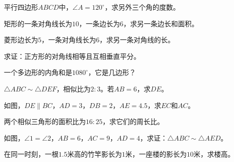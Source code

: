 \documentclass[a4paper,12pt]{ctexart}
\begin{document}



\begin{exercise}
\item 平行四边形$ABCD$中，$\angle A=120^\circ$，求另外三个角的度数。
\item 矩形的一条对角线长为$10$，一条边长为$6$，求另一条边长和面积。
\item 菱形边长为$5$，一条对角线长为$6$，求另一条对角线的长。
\item 求证：正方形的对角线相等且互相垂直平分。
\item 一个多边形的内角和是$1080^\circ$，它是几边形？
\end{exercise}

\newpage









\begin{exercise}
\item $\triangle ABC\sim\triangle DEF$，相似比为$2:3$。若$AB=6$，求$DE$。

\item 如图，$DE\parallel BC$，$AD=3$，$DB=2$，$AE=4.5$，求$EC$和$AC$。

\item 两个相似三角形的面积比为$16:25$，求它们的周长比。

\item 如图，$\angle1=\angle2$，$AB=6$，$AC=9$，$AD=4$，求证：$\triangle ABC\sim\triangle AED$。

\item 在同一时刻，一根$1.5$米高的竹竿影长为$1$米，一座楼的影长为$10$米，求楼高。
\end{exercise}
\end{document}
